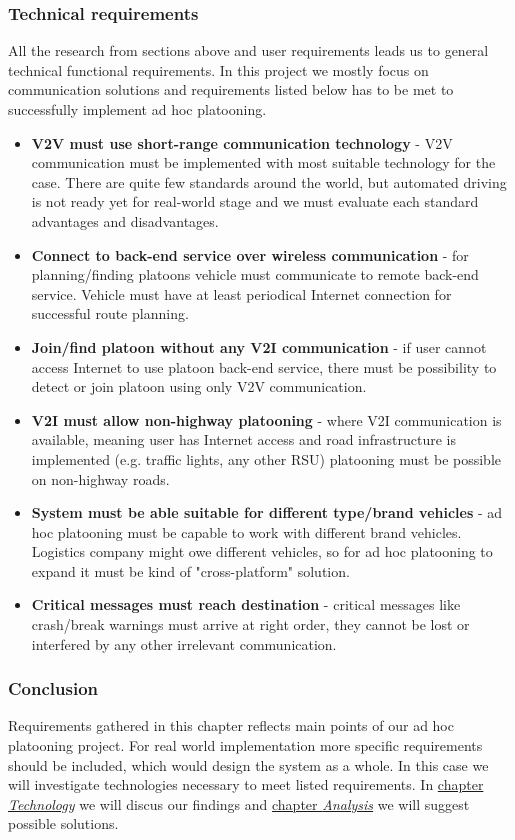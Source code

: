\subsubsection{Technical requirements}
%
All the research from sections above and user requirements leads us to general technical functional requirements. In this project we mostly focus on communication solutions and requirements listed below has to be met to successfully implement ad hoc platooning.
%
\begin{itemize}
    \item\textbf{\acrshort{V2V} must use short-range communication technology} - \acrshort{V2V} communication must be implemented with most suitable technology for the case. There are quite few standards around the world, but automated driving is not ready yet for real-world stage and we must evaluate each standard advantages and disadvantages.
    \item\textbf{Connect to back-end service over wireless communication} - for planning/finding platoons vehicle must communicate to remote back-end service. Vehicle must have at least periodical Internet connection for successful route planning.
    \item\textbf{Join/find platoon without any V2I communication} - if user cannot access Internet to use platoon back-end service, there must be possibility to detect or join platoon using only V2V communication.
    \item\textbf{\acrshort{V2I} must allow non-highway platooning} - where \acrshort{V2I} communication is available, meaning user has Internet access and road infrastructure is implemented (e.g. traffic lights, any other \acrshort{RSU}) platooning must be possible on non-highway roads. 
    \item\textbf{System must be able suitable for different type/brand vehicles} - ad hoc platooning must be capable to work with different brand vehicles. Logistics company might owe different vehicles, so for ad hoc platooning to expand it must be kind of "cross-platform" solution.
    \item\textbf{Critical messages must reach destination} - critical messages like crash/break warnings must arrive at right order, they cannot be lost or interfered by any other irrelevant communication.
\end{itemize}\par
%
\subsubsection{Conclusion}
Requirements gathered in this chapter reflects main points of our ad hoc platooning project. For real world implementation more specific requirements should be included, which would design the system as a whole. In this case we will investigate technologies necessary to meet listed requirements. In \hyperref[sec:technology]{chapter \textit{Technology}} we will discus our findings and \hyperref[sec:analysis]{chapter \textit{Analysis}} we will suggest possible solutions.